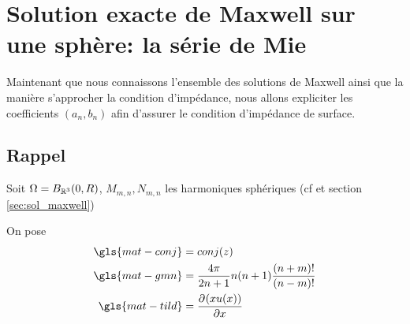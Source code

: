 \section{Solution exacte de Maxwell sur une sphère: la série de Mie}\label{sec:serie_mie}


Maintenant que nous connaissons l'ensemble des solutions de Maxwell ainsi que la manière s'approcher la condition d'impédance, nous allons expliciter les coefficients $(a_n,b_n)$  afin d'assurer le condition d'impédance de surface.


\subsection{Rappel}
Soit $\Omega = B_{\mathbb R^3}(0,R)$, $M_{m,n}, N_{m,n}$ les harmoniques sphériques (cf \cite{marceaux_high-order_2000} et section \ref{sec:sol_maxwell})


On pose
\begin{align*}
  \gls{mat-conj} &=conj(z)\\
  \gls{mat-gmn} &=\frac{4\pi}{2n+1}n(n+1)\frac{(n+m)!}{(n-m)!}\\
  \gls{mat-tild} &= \ddr{x}{(xu(x))}
\end{align*}

